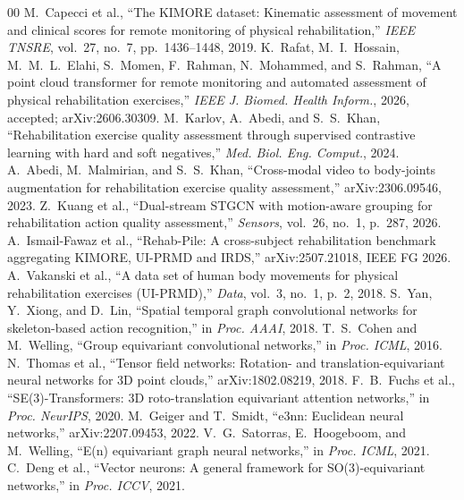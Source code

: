 \documentclass[10pt,twocolumn,letterpaper]{article}
\begin{document}
\begin{thebibliography}{00}
 M.~Capecci et al., ``The KIMORE dataset: Kinematic assessment of movement and clinical scores for remote monitoring of physical rehabilitation,'' \textit{IEEE TNSRE}, vol.~27, no.~7, pp.~1436--1448, 2019.
 K.~Rafat, M.~I.~Hossain, M.~M.~L.~Elahi, S.~Momen, F.~Rahman, N.~Mohammed, and S.~Rahman, ``A point cloud transformer for remote monitoring and automated assessment of physical rehabilitation exercises,'' \textit{IEEE J. Biomed. Health Inform.}, 2026, accepted; arXiv:2606.30309.
 M.~Karlov, A.~Abedi, and S.~S.~Khan, ``Rehabilitation exercise quality assessment through supervised contrastive learning with hard and soft negatives,'' \textit{Med. Biol. Eng. Comput.}, 2024.
 A.~Abedi, M.~Malmirian, and S.~S.~Khan, ``Cross-modal video to body-joints augmentation for rehabilitation exercise quality assessment,'' arXiv:2306.09546, 2023.
 Z.~Kuang et al., ``Dual-stream STGCN with motion-aware grouping for rehabilitation action quality assessment,'' \textit{Sensors}, vol.~26, no.~1, p.~287, 2026.
 A.~Ismail-Fawaz et al., ``Rehab-Pile: A cross-subject rehabilitation benchmark aggregating KIMORE, UI-PRMD and IRDS,'' arXiv:2507.21018, IEEE FG 2026.
 A.~Vakanski et al., ``A data set of human body movements for physical rehabilitation exercises (UI-PRMD),'' \textit{Data}, vol.~3, no.~1, p.~2, 2018.
 S.~Yan, Y.~Xiong, and D.~Lin, ``Spatial temporal graph convolutional networks for skeleton-based action recognition,'' in \textit{Proc. AAAI}, 2018.
 T.~S.~Cohen and M.~Welling, ``Group equivariant convolutional networks,'' in \textit{Proc. ICML}, 2016.
 N.~Thomas et al., ``Tensor field networks: Rotation- and translation-equivariant neural networks for 3D point clouds,'' arXiv:1802.08219, 2018.
 F.~B.~Fuchs et al., ``SE(3)-Transformers: 3D roto-translation equivariant attention networks,'' in \textit{Proc. NeurIPS}, 2020.
 M.~Geiger and T.~Smidt, ``e3nn: Euclidean neural networks,'' arXiv:2207.09453, 2022.
 V.~G.~Satorras, E.~Hoogeboom, and M.~Welling, ``E(n) equivariant graph neural networks,'' in \textit{Proc. ICML}, 2021.
 C.~Deng et al., ``Vector neurons: A general framework for SO(3)-equivariant networks,'' in \textit{Proc. ICCV}, 2021.

\end{thebibliography}
\end{document}
